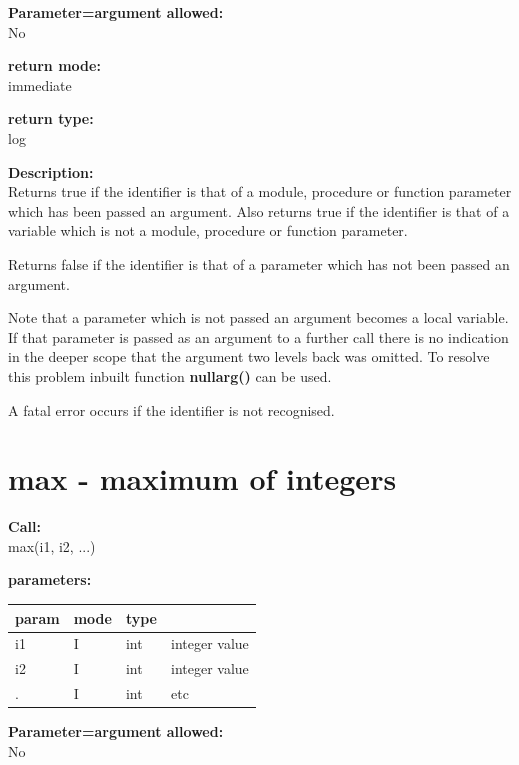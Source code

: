         {\bf Parameter=argument allowed:} \\
        No
        
        {\bf return mode:} \\
        immediate

        {\bf return type:} \\
        log
        
        {\bf Description:} \\
        Returns true if the identifier is that of a module, procedure or
        function parameter which has been passed an argument. Also returns true
        if the identifier is that of a variable which is not a module, procedure
        or function parameter.

        Returns false if the identifier is that of a parameter which has not
        been passed an argument.
        
        Note that a parameter which is not passed an argument becomes a local
        variable. If that parameter is passed as an argument to a further
        call there is no indication in the deeper scope that the argument
        two levels back was omitted. To resolve this problem inbuilt function
        {\bf nullarg()}  can be used.
        
        A fatal error occurs if the identifier is not recognised.


    \section{max - maximum of integers}\label{sec:ifmax}
        
        
        {\bf Call:} \\
        max(i1, i2, ...)
        
        {\bf parameters:} \\
        \begin{tabular}{| l | l | l | l |}
        \hline
        param  & mode & type & \\
        \hline \hline
        i1 & I & int & integer value    \\ \hline
        i2 & I & int & integer value    \\ \hline
        .  & I & int & etc              \\ \hline
        \end{tabular}
        
        {\bf Parameter=argument allowed:} \\
        No
        
